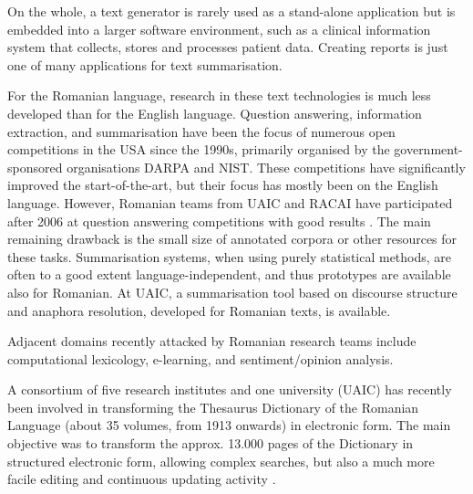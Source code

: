 \begin{multicols}{2}
On the whole, a text generator is rarely used as a stand-alone application but is embedded into a larger software environment, such as a clinical information system that collects, stores and processes patient data. Creating reports is just one of many applications for text summarisation. 


For the Romanian language, research in these text technologies is much less developed than for the English language. Question answering, information extraction, and summarisation have been the focus of numerous open competitions in the USA since the 1990s, primarily organised by the government-sponsored organisations DARPA and NIST. These competitions have significantly improved the start-of-the-art, but their focus has mostly been on the English language. However, Romanian teams from UAIC and RACAI have participated after 2006 at question answering competitions with good results \cite{qa}. The main remaining drawback is the small size of annotated corpora or other resources for these tasks. Summarisation systems, when using purely statistical methods, are often to a good extent language-independent, and thus prototypes are available also for Romanian. At UAIC, a summarisation tool based on discourse structure and anaphora resolution, developed for Romanian texts, is available.

Adjacent domains recently attacked by Romanian research teams include computational lexicology, e-learning, and sentiment/opinion analysis. 

A consortium of five research institutes and one university (UAIC) has recently been involved in transforming the Thesaurus Dictionary of the Romanian Language (about 35 volumes, from 1913 onwards) in electronic form. The main objective was to transform the approx. 13.000 pages of the Dictionary in structured electronic form, allowing complex searches, but also a much more facile editing and continuous updating activity \cite{cristea3}.


\end{multicols}

